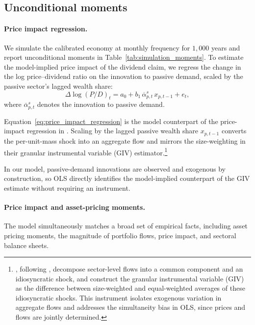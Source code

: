 \documentclass[12pt,english]{article}
\begin{document}


\subsection{Unconditional moments}\label{sec:uncond-moments}

\paragraph{Price impact regression.} 
We simulate the calibrated economy at monthly frequency for $1{,}000$ years and report unconditional moments in Table~\ref{tab:simulation_moments}.
To estimate the model-implied price impact of the dividend claim, we regress the change in the log price--dividend ratio on the innovation to passive demand, scaled by the passive sector's lagged wealth share:
\begin{equation}\label{eq:price_impact_regression}
    \Delta\log (P/D)_t = a_0 + b_1\,\overline{\alpha}_{p,t}^{s}\,x_{p,t-1} + e_t,
\end{equation}
where $\overline{\alpha}_{p,t}^{s}$ denotes the innovation to passive demand.

Equation~\eqref{eq:price_impact_regression} is the model counterpart of the price-impact regression in \citet{gabaix2020search}.
Scaling by the lagged passive wealth share $x_{p,t-1}$ converts the per-unit-mass shock into an aggregate flow and mirrors the size-weighting in their granular instrumental variable (GIV) estimator.\footnote{
    \citet{gabaix2020search}, following \citet{gabaix2024granular}, decompose sector-level flows into a common component and an idiosyncratic shock, and construct the granular instrumental variable (GIV) as the difference between size-weighted and equal-weighted averages of these idiosyncratic shocks.
    This instrument isolates exogenous variation in aggregate flows and addresses the simultaneity bias in OLS, since prices and flows are jointly determined.
}

In our model, passive-demand innovations are observed and exogenous by construction, so OLS directly identifies the model-implied counterpart of the GIV estimate without requiring an instrument.

\paragraph{Price impact and asset-pricing moments.} 
The model simultaneously matches a broad set of empirical facts, including asset pricing moments, the magnitude of portfolio flows, price impact, and sectoral balance sheets.
\end{document}
